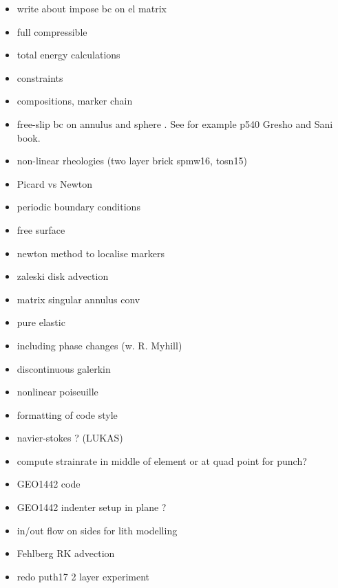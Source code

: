 \documentclass[a4paper]{article}
\begin{document}
\begin{itemize}
\item
write about impose bc on el matrix

\item
full compressible 

\item
total energy calculations

\item
constraints

\item
compositions, marker chain

\item
free-slip bc on annulus and sphere . See for example p540 Gresho and Sani book.

\item
non-linear rheologies (two layer brick spmw16, tosn15) 

\item
Picard vs Newton

\item
periodic boundary conditions

\item
free surface 

\item 
newton method to localise markers

\item
zaleski disk advection

\item matrix singular annulus conv

\item
pure elastic 

\item
including phase changes (w. R. Myhill)

\item
discontinuous galerkin

\item
nonlinear poiseuille

\item
formatting of code style

\item
navier-stokes ? (LUKAS)

\item
compute strainrate in middle of element or at quad point for punch?

\item
GEO1442 code 

\item
GEO1442 indenter setup in plane ?

\item
in/out flow on sides for lith modelling

\item
Fehlberg RK advection

\item redo puth17 2 layer experiment

\end{itemize}
\end{document}
